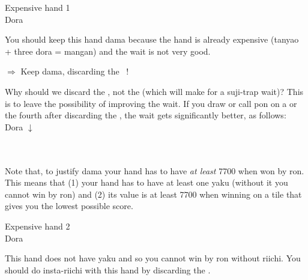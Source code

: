 \bigskip
\begin{itembox}[r]{Expensive hand 1}
\bp
{}~~\\
\hspace{310pt}\footnotesize{\jap Dora}
\ep
\vspace{-15pt}
\end{itembox}
\noindent You should keep this hand {\jap dama} because the hand is already expensive ({\jap tanyao} + three {\jap dora} = {\jap mangan}) and the wait is not very good. 
\begin{center}
{\large $\Rightarrow$ Keep {\jap dama}, discarding the ~!}
\end{center}
Why should we discard the {\large{}}, not the {\large{}} (which will make for a {\jap suji}-trap wait)? 
This is to leave the possibility of improving the wait. If you draw or call {\jap pon} on a {\large{}} or the fourth {\large{}} after discarding the {\large{}}, the wait gets significantly better, as follows:
\bp
{}~~\\
\hspace{295pt}\footnotesize{\jap Dora}
\ep
\bp
\vspace{-50pt}
$\downarrow$\\
 \\
\\
\ep

\bigskip
Note that, to justify {\jap dama} your hand has to have \emph{at least} 7700 when won by {\jap ron}. This means that (1) your hand has to have at least one {\jap yaku} (without it you cannot win by {\jap ron}) and (2) its value is at least 7700 when winning on a tile that gives you the lowest possible score. 

\bigskip
\begin{itembox}[r]{Expensive hand 2}
\bp
{}~~\\
\hspace{310pt}\footnotesize{\jap Dora}
\ep
\vspace{-15pt}
\end{itembox}
\noindent 
This hand does not have {\jap yaku} and so you cannot win by {\jap ron} without {\jap riichi}. You should do insta-{\jap riichi} with this hand by discarding the {\large{}}. 

